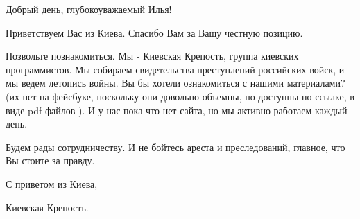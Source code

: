  
 
 
 
 


Добрый день, глубокоуважаемый Илья!

Приветствуем Вас из Киева. Спасибо Вам за Вашу честную позицию.

Позвольте познакомиться. Мы - Киевская Крепость, группа киевских программистов.
Мы собираем свидетельства преступлений российских войск, и мы ведем летопись
войны.  Вы бы хотели ознакомиться с нашими материалами? (их нет на фейсбуке,
поскольку они довольно объемны, но доступны по ссылке, в виде pdf файлов ). И у
нас пока что нет сайта, но мы активно работаем каждый день.

Будем рады сотрудничеству. И не бойтесь ареста и преследований, главное, что Вы
стоите за правду.

С приветом из Киева,

Киевская Крепость.
